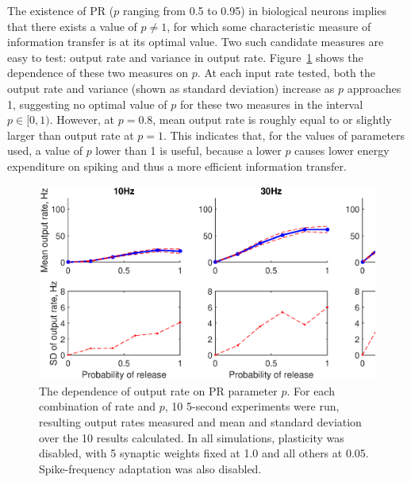 \documentclass[a4paper,12pt]{report}
\theoremstyle{definition}
\begin{document}


The existence of PR ($p$ ranging from 0.5 to 0.95) in biological neurons implies that there exists a value of $p \neq 1$, for which some characteristic measure of information transfer is at its optimal value. Two such candidate measures are easy to test: output rate and variance in output rate. Figure~\ref{fig:exp7grid} shows the dependence of these two measures on $p$. At each input rate tested, both the output rate and variance (shown as standard deviation) increase as $p$ approaches 1, suggesting no optimal value of $p$ for these two measures in the interval $p \in [0,1)$. However, at $p=0.8$, mean output rate is roughly equal to or slightly larger than output rate at $p=1$. This indicates that, for the values of parameters used, a value of $p$ lower than 1 is useful, because a lower $p$ causes lower energy expenditure on spiking and thus a more efficient information transfer.

\begin{figure}[!htb]
    \includegraphics[width=\textwidth]{figures/exp7_PRoutputvariance_grid.eps}
    \caption{The dependence of output rate on PR parameter $p$. For each combination of rate and $p$, 10 5-second experiments were run, resulting output rates measured and mean and standard deviation over the 10 results calculated. In all simulations, plasticity was disabled, with 5 synaptic weights fixed at 1.0 and all others at 0.05. Spike-frequency adaptation was also disabled.}
    \label{fig:exp7grid}
\end{figure}
\end{document}

